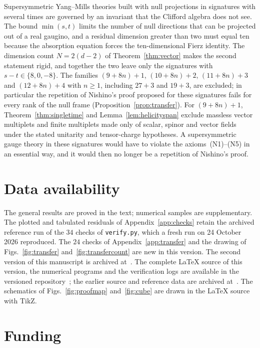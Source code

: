 Supersymmetric Yang--Mills theories built with null projections in signatures with several times are governed by an invariant that the Clifford algebra does not see. The bound $\min(s,t)$ limits the number of null directions that can be projected out of a real gaugino, and a residual dimension greater than two must equal ten because the absorption equation forces the ten-dimensional Fierz identity. The dimension count $N=2(d-2)$ of Theorem~\ref{thm:vector} makes the second statement rigid, and together the two leave only the signatures with $s-t\in\{8,0,-8\}$. The families $(9+8n)+1$, $(10+8n)+2$, $(11+8n)+3$ and $(12+8n)+4$ with $n\ge1$, including $27+3$ and $19+3$, are excluded; in particular the repetition of Nishino's proof proposed for these signatures fails for every rank of the null frame (Proposition~\ref{prop:transfer}). For $(9+8n)+1$, Theorem~\ref{thm:singletime} and Lemma~\ref{lem:helicityspan} exclude massless vector multiplets and finite multiplets made only of scalar, spinor and vector fields under the stated unitarity and tensor-charge hypotheses. A supersymmetric gauge theory in these signatures would have to violate the axioms~(N1)--(N5) in an essential way, and it would then no longer be a repetition of Nishino's proof.

\section*{Data availability}

The general results are proved in the text; numerical samples are supplementary. The plotted and tabulated residuals of Appendix~\ref{app:checks} retain the archived reference run of the $34$ checks of \texttt{verify.py}, which a fresh run on 24 October 2026 reproduced. The $24$ checks of Appendix~\ref{app:transfer} and the drawing of Figs.~\ref{fig:transfer} and~\ref{fig:transfercount} are new in this version. The second version of this manuscript is archived at~\cite{Paper4Revision}. The complete \LaTeX{} source of this version, the numerical programs and the verification logs are available in the versioned repository~\cite{Paper4Release}; the earlier source and reference data are archived at~\cite{BhattacharjeeArchive2026}. The schematics of Figs.~\ref{fig:proofmap} and~\ref{fig:cube} are drawn in the \LaTeX{} source with TikZ.

\section*{Funding}

